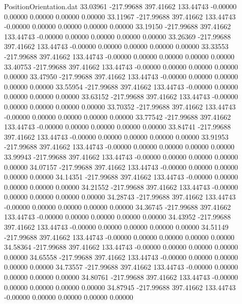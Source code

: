 \begin{filecontents}{PositionOrientation.dat}
  33.03961 -217.99688  397.41662   133.44743   -0.00000    0.00000    0.00000    0.00000    0.00000
  33.11967 -217.99688  397.41662   133.44743   -0.00000    0.00000    0.00000    0.00000    0.00000
  33.19150 -217.99688  397.41662   133.44743   -0.00000    0.00000    0.00000    0.00000    0.00000
  33.26369 -217.99688  397.41662   133.44743   -0.00000    0.00000    0.00000    0.00000    0.00000
  33.33553 -217.99688  397.41662   133.44743   -0.00000    0.00000    0.00000    0.00000    0.00000
  33.40753 -217.99688  397.41662   133.44743   -0.00000    0.00000    0.00000    0.00000    0.00000
  33.47950 -217.99688  397.41662   133.44743   -0.00000    0.00000    0.00000    0.00000    0.00000
  33.55954 -217.99688  397.41662   133.44743   -0.00000    0.00000    0.00000    0.00000    0.00000
  33.63152 -217.99688  397.41662   133.44743   -0.00000    0.00000    0.00000    0.00000    0.00000
  33.70352 -217.99688  397.41662   133.44743   -0.00000    0.00000    0.00000    0.00000    0.00000
  33.77542 -217.99688  397.41662   133.44743   -0.00000    0.00000    0.00000    0.00000    0.00000
  33.84741 -217.99688  397.41662   133.44743   -0.00000    0.00000    0.00000    0.00000    0.00000
  33.91953 -217.99688  397.41662   133.44743   -0.00000    0.00000    0.00000    0.00000    0.00000
  33.99943 -217.99688  397.41662   133.44743   -0.00000    0.00000    0.00000    0.00000    0.00000
  34.07157 -217.99688  397.41662   133.44743   -0.00000    0.00000    0.00000    0.00000    0.00000
  34.14351 -217.99688  397.41662   133.44743   -0.00000    0.00000    0.00000    0.00000    0.00000
  34.21552 -217.99688  397.41662   133.44743   -0.00000    0.00000    0.00000    0.00000    0.00000
  34.28743 -217.99688  397.41662   133.44743   -0.00000    0.00000    0.00000    0.00000    0.00000
  34.36745 -217.99688  397.41662   133.44743   -0.00000    0.00000    0.00000    0.00000    0.00000
  34.43952 -217.99688  397.41662   133.44743   -0.00000    0.00000    0.00000    0.00000    0.00000
  34.51149 -217.99688  397.41662   133.44743   -0.00000    0.00000    0.00000    0.00000    0.00000
  34.58364 -217.99688  397.41662   133.44743   -0.00000    0.00000    0.00000    0.00000    0.00000
  34.65558 -217.99688  397.41662   133.44743   -0.00000    0.00000    0.00000    0.00000    0.00000
  34.73557 -217.99688  397.41662   133.44743   -0.00000    0.00000    0.00000    0.00000    0.00000
  34.80761 -217.99688  397.41662   133.44743   -0.00000    0.00000    0.00000    0.00000    0.00000
  34.87945 -217.99688  397.41662   133.44743   -0.00000    0.00000    0.00000    0.00000    0.00000

\end{filecontents}
